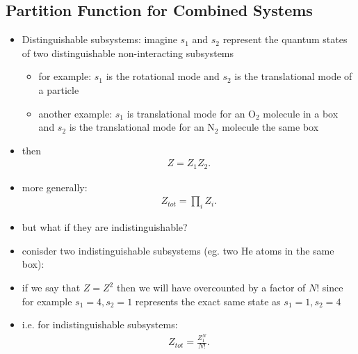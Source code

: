 \documentclass[10pt]{article}
\begin{document}
\subsection{Partition Function for Combined Systems}
\begin{itemize}
    \item Distinguishable subsystems: imagine $s_1$ and $s_2$ represent the quantum states of two distinguishable non-interacting subsystems
        \begin{itemize}
            \item for example: $s_1$ is the rotational mode and $s_2$ is the translational mode of a particle 
            \item another example: $s_1$ is translational mode for an O$_2$ molecule in a box and $s_2$ is the translational mode for an N$_2$ molecule the same box
        \end{itemize}
    \item then 
        \begin{gather*}
            Z = Z_1Z_2
        .\end{gather*}
    \item more generally:
        \begin{gather*}
            Z_{tot} = \prod_{i} Z_i 
        .\end{gather*}
    \item but what if they are indistinguishable?
    \item conisder two indistinguishable subsystems (eg. two He atoms in the same box):
    \item if we say that $Z = Z^2$ then we will have overcounted by a factor of $N!$ since for example $s_1=4, s_2 = 1$ represents the exact same state as $s_1 = 1, s_2=4$ 
    \item i.e. for indistinguishable subsystems:
        \begin{gather*}
            Z_{tot} = \frac{Z_1^N}{N!}
        .\end{gather*}
\end{itemize}
\end{document}
